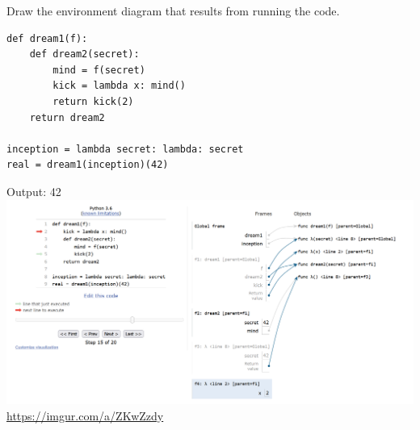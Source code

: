 \begin{blocksection}
\question Draw the environment diagram that results from running the code.

\begin{lstlisting}
def dream1(f):
    def dream2(secret):
        mind = f(secret)
        kick = lambda x: mind()
        return kick(2)
    return dream2

inception = lambda secret: lambda: secret
real = dream1(inception)(42)
\end{lstlisting}

\begin{solution}[2in]
Output: 42 \newline
\includegraphics[scale=0.5]{newInception.png}
\newline
\url{https://imgur.com/a/ZKwZzdy}
\end{solution}
\end{blocksection}
